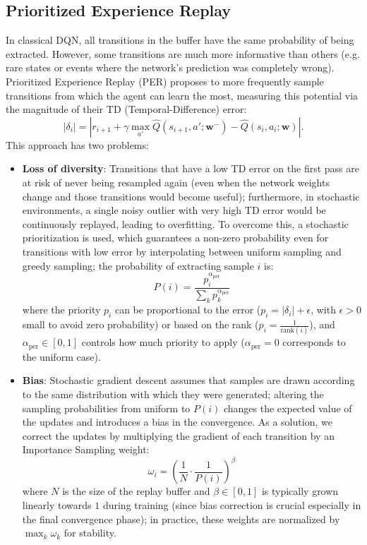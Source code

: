 \documentclass[10pt, a4paper]{report}
\begin{document}
\subsection{Prioritized Experience Replay}
In classical DQN, all transitions in the buffer have the same probability of being extracted. However, some transitions are much more informative than others (e.g. rare states or events where the network's prediction was completely wrong). Prioritized Experience Replay (PER) proposes to more frequently sample transitions from which the agent can learn the most, measuring this potential via the magnitude of their TD (Temporal-Difference) error:\begin{equation}
    \vert{}\delta_i\vert{} = \left\vert{} r_{i+1} + \gamma \max_{a'} \hat{Q}(s_{i+1}, a'; \mathbf{w}^-) - \hat{Q}(s_i, a_i; \mathbf{w}) \right\vert{}.
\end{equation}
This approach has two problems:\begin{itemize}
    \item \textbf{Loss of diversity}: Transitions that have a low TD error on the first pass are at risk of never being resampled again (even when the network weights change and those transitions would become useful); furthermore, in stochastic environments, a single noisy outlier with very high TD error would be continuously replayed, leading to overfitting. To overcome this, a stochastic prioritization is used, which guarantees a non-zero probability even for transitions with low error by interpolating between uniform sampling and greedy sampling; the probability of extracting sample $i$ is:
    $$P(i) = \frac{p_i^{\alpha_{\text{per}}}}{\sum_k p_k^{\alpha_{\text{per}}}}$$where the priority $p_i$ can be proportional to the error ($p_i = \vert{}\delta_i\vert{} + \epsilon$, with $\epsilon > 0$ small to avoid zero probability) or based on the rank ($p_i = \frac{1}{\text{rank}(i)}$), and $\alpha_{\text{per}} \in [0, 1]$ controls how much priority to apply ($\alpha_{\text{per}} = 0$ corresponds to the uniform case).
    \item \textbf{Bias}: Stochastic gradient descent assumes that samples are drawn according to the same distribution with which they were generated; altering the sampling probabilities from uniform to $P(i)$ changes the expected value of the updates and introduces a bias in the convergence. As a solution, we correct the updates by multiplying the gradient of each transition by an Importance Sampling weight:$$\omega_i = \left( \frac{1}{N} \cdot \frac{1}{P(i)} \right)^\beta$$
    where $N$ is the size of the replay buffer and $\beta \in [0, 1]$ is typically grown linearly towards $1$ during training (since bias correction is crucial especially in the final convergence phase); in practice, these weights are normalized by $\max_k \omega_k$ for stability.
\end{itemize}
\end{document}
